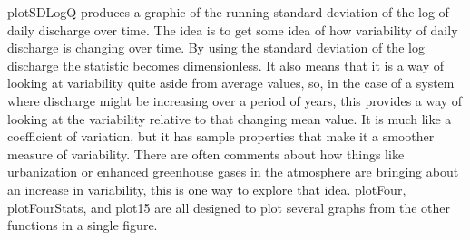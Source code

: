 \documentclass[a4paper,11pt]{article}\usepackage[]{graphicx}\usepackage[]{color}
\begin{document}
plotSDLogQ produces a graphic of the running standard deviation of the log of daily discharge over time.  The idea is to get some idea of how variability of daily discharge is changing over time.  By using the standard deviation of the log discharge the statistic becomes dimensionless.  It also means that it is a way of looking at variability quite aside from average values, so, in the case of a system where discharge might be increasing over a period of years, this provides a way of looking at the variability relative to that changing mean value.  It is much like a coefficient of variation, but it has sample properties that make it a smoother measure of variability.  There are often comments about how things like urbanization or enhanced greenhouse gases in the atmosphere are bringing about an increase in variability, this is one way to explore that idea. plotFour, plotFourStats, and plot15 are all designed to plot several graphs from the other functions in a single figure. 
\end{document}
